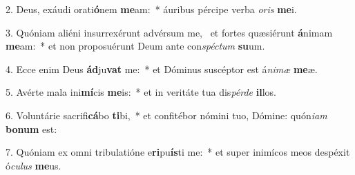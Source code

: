 2. Deus, exáudi orati\textbf{ó}nem \textbf{me}am:~*  áuribus pércipe verba \textit{o}\textit{ris} \textbf{me}i.\

3. Quóniam aliéni insurrexérunt advérsum me, \dag\  et fortes quæsiérunt \textbf{á}nimam \textbf{me}am:~*  et non proposuérunt Deum ante con\textit{spéc}\textit{tum} \textbf{su}um.\

4. Ecce enim Deus \textbf{ád}ju\textbf{vat} me:~*  et Dóminus suscéptor est á\textit{ni}\textit{mæ} \textbf{me}æ.\

5. Avérte mala ini\textbf{mí}cis \textbf{me}is:~*  et in veritáte tua dis\textit{pér}\textit{de} \textbf{il}los.\

6. Voluntárie sacrifi\textbf{cá}bo \textbf{ti}bi,~*  et confitébor nómini tuo, Dómine: quón\textit{i}\textit{am} \textbf{bo}\textbf{num} est:\

7. Quóniam ex omni tribulatióne e\textbf{ri}pu\textbf{ís}ti me:~*  et super inimícos meos despéxit ó\textit{cu}\textit{lus} \textbf{me}us.\

